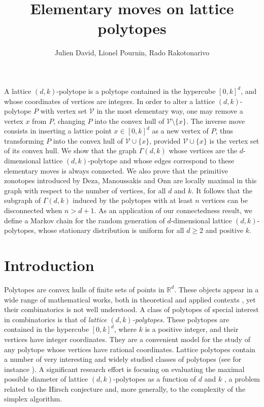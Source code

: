 \documentclass[a4paper]{article}
\begin{document}
\title{Elementary moves on lattice polytopes}
\author{Julien David, Lionel Pournin, Rado Rakotonarivo}
\maketitle

{\small {} A lattice $(d,k)$-polytope is a polytope contained in the hypercube $[0,k]^d$, and whose coordinates of vertices are integers. In order to alter a lattice $(d,k)$-polytope $P$ with vertex set $\mathcal{V}$ in the most elementary way, one may remove a vertex $x$ from $P$, changing $P$ into the convex hull of $\mathcal{V}\mathord{\setminus}\{x\}$. The inverse move consists in inserting a lattice point $x\in[0,k]^d$ as a new vertex of $P$, thus transforming $P$ into the convex hull of $\mathcal{V}\cup\{x\}$, provided $\mathcal{V}\cup\{x\}$
is the vertex set of its convex hull. We show that the graph $\Gamma(d,k)$ whose vertices are the $d$-dimensional lattice $(d,k)$-polytope and whose edges correspond to these elementary moves is always connected. We also prove that the primitive zonotopes introduced by Deza, Manoussakis and Onn are locally maximal in this graph with respect to the number of vertices, for all $d$ and $k$. It follows that the subgraph of $\Gamma(d,k)$ induced by the polytopes with at least $n$ vertices can be disconnected when $n>d+1$. As an application of our connectedness result, we define a Markov chain for the random generation of $d$-dimensional lattice $(d,k)$-polytopes, whose stationary distribution is uniform for all $d\geq2$ and positive $k$.}

\section{Introduction}

Polytopes are convex hulls of finite sets of points in $\mathbb{R}^d$. These objects appear in a wide range of mathematical works, both in theoretical and applied contexts \cite{Ziegler1995}, yet their combinatorics is not well understood. A class of polytopes of special interest in combinatorics is that of \emph{lattice $(d,k)$-polytopes}. These polytopes are contained in the hypercube $[0,k]^d$, where $k$ is a positive integer, and their vertices have integer coordinates. They are a convenient model for the study of any polytope whose vertices have rational coordinates. Lattice polytopes contain a number of very interesting and widely studied classes of polytopes (see for instance \cite{DezaManoussakisOnn2018, GrandeRue2015}). A significant research effort is focusing on evaluating the maximal possible diameter of lattice $(d,k)$-polytopes as a function of $d$ and $k$ \cite{DelPiaMichini2016,DezaManoussakisOnn2018,DezaPournin2018,KleinschmidtOnn1992,Naddef1989}, a problem related to the Hirsch conjecture \cite{BonifasDiSummaEisenbrandHahnleNiemeier2014,BorgwardtDeLoeraFinhold2016,KalaiKleitman1992,KleeWalkup1967,Santos2012} and, more generally, to the complexity of the simplex algorithm.
\end{document}
